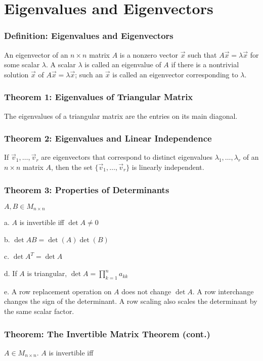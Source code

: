 \documentclass{article}
\begin{document}
\section{Eigenvalues and Eigenvectors}
\subsubsection*{Definition: Eigenvalues and Eigenvectors}
An eigenvector of an $n \times n$ matrix $A$ is a nonzero vector $\vec x$ such that $A \vec x = \lambda \vec x$ for some scalar $\lambda$. A scalar $\lambda$ is called an eigenvalue of $A$ if there is a nontrivial solution $\vec x$ of $A \vec x = \lambda \vec x$; such an $\vec x$ is called an eigenvector corresponding to $\lambda$.

\subsubsection*{Theorem 1: Eigenvalues of Triangular Matrix}
The eigenvalues of a triangular matrix are the entries on its main diagonal.

\subsubsection*{Theorem 2: Eigenvalues and Linear Independence}
If $\vec v_1 , \dots , \vec v_r$ are eigenvectors that correspond to distinct eigenvalues $\lambda_1 , \dots , \lambda _r$ of an $n \times n$ matrix $A$, then the set $\{ \vec v_1 , \dots , \vec v_r \}$ is linearly independent. 

\subsubsection*{Theorem 3: Properties of Determinants}
$A, B \in M_{n \times n}$

a. $A$ is invertible iff $\det A \neq 0$

b. $\det AB = \det(A)\det(B)$

c. $\det A^T = \det A$

d. If $A$ is triangular, $\det A = \prod_{k = 1}^{n} a_{kk}$

e. A row replacement operation on $A$ does not change $\det A$. A row interchange changes the sign of the determinant. A row scaling also scales the determinant by the same scalar factor. 

\subsubsection*{Theorem: The Invertible Matrix Theorem (cont.)}
$A \in M_{n \times n}$. $A$ is invertible iff
\end{document}
